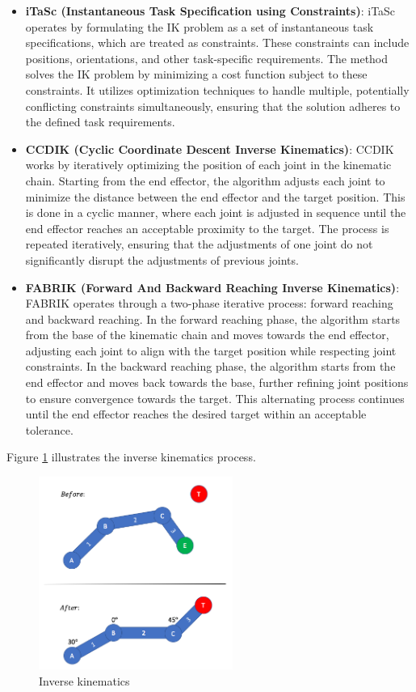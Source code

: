 \documentclass[../../main.tex]{subfiles}
\begin{document}
\begin{itemize} 
  \item \textbf{iTaSc (Instantaneous Task Specification using Constraints)}: iTaSc\cite{4648032} operates by formulating the IK problem as a set of instantaneous task specifications, which are treated as constraints. These constraints can include positions, orientations, and other task-specific requirements. The method solves the IK problem by minimizing a cost function subject to these constraints. It utilizes optimization techniques to handle multiple, potentially conflicting constraints simultaneously, ensuring that the solution adheres to the defined task requirements.

  \item \textbf{CCDIK (Cyclic Coordinate Descent Inverse Kinematics)}: CCDIK\cite{kenwright2012inverse} works by iteratively optimizing the position of each joint in the kinematic chain. Starting from the end effector, the algorithm adjusts each joint to minimize the distance between the end effector and the target position. This is done in a cyclic manner, where each joint is adjusted in sequence until the end effector reaches an acceptable proximity to the target. The process is repeated iteratively, ensuring that the adjustments of one joint do not significantly disrupt the adjustments of previous joints.

  \item \textbf{FABRIK (Forward And Backward Reaching Inverse Kinematics)}: FABRIK\cite{aristidou2011fabrik} operates through a two-phase iterative process: forward reaching and backward reaching. In the forward reaching phase, the algorithm starts from the base of the kinematic chain and moves towards the end effector, adjusting each joint to align with the target position while respecting joint constraints. In the backward reaching phase, the algorithm starts from the end effector and moves back towards the base, further refining joint positions to ensure convergence towards the target. This alternating process continues until the end effector reaches the desired target within an acceptable tolerance.
\end{itemize}

Figure \ref{fig:inverse_kinematics_example} illustrates the inverse kinematics process.

\begin{figure} 
  \centering \includegraphics[width = 2.5in]{chapters/background_work/images/inverse_kinematics_example.png} 
  \caption{Inverse kinematics} 
  \label{fig:inverse_kinematics_example} 
\end{figure}
\end{document}
